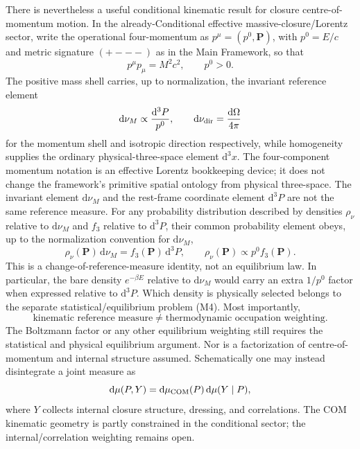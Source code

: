 \documentclass[11pt]{article}
\theoremstyle{definition}
\newcommand{\dd}{\mathrm{d}}
\begin{document}
There is nevertheless a useful conditional kinematic result for closure centre-of-momentum
motion.  In the already-Conditional effective massive-closure/Lorentz sector, write the
operational four-momentum as $p^\mu=(p^0,\bm P)$, with $p^0=E/c$
and metric signature $(+---)$ as in the Main Framework, so that
\begin{equation}
  p^\mu p_\mu=M^2c^2,\qquad p^0>0.
  \label{eq:mass-shell-reference}
\end{equation}
The positive mass shell carries, up to normalization, the invariant reference element
\begin{equation}
  \dd\nu_M\propto\frac{\dd^3P}{p^0},
  \qquad
  \dd\nu_{\rm dir}=\frac{\dd\Omega}{4\pi}
  \label{eq:com-reference-measures}
\end{equation}
for the momentum shell and isotropic direction respectively, while homogeneity supplies the
ordinary physical-three-space element $\dd^3x$.  The four-component momentum notation is an
effective Lorentz bookkeeping device; it does not change the framework's primitive spatial
ontology from physical three-space.  The invariant element $\dd\nu_M$ and the
rest-frame coordinate element $\dd^3P$ are not the same reference measure.  For any
probability distribution described by densities $\rho_\nu$ relative to $\dd\nu_M$
and $f_3$ relative to $\dd^3P$, their common probability element obeys, up to the
normalization convention for $\dd\nu_M$,
\begin{equation}
  \rho_\nu(\bm P)\,\dd\nu_M
  = f_3(\bm P)\,\dd^3P,
  \qquad \rho_\nu(\bm P)\propto p^0 f_3(\bm P).
  \label{eq:com-density-conversion}
\end{equation}
This is a change-of-reference-measure identity, not an equilibrium law.  In particular,
the bare density $e^{-\beta E}$ relative to $\dd\nu_M$ would carry an extra
$1/p^0$ factor when expressed relative to $\dd^3P$.  Which density is physically
selected belongs to the separate statistical/equilibrium problem (M4).
Most importantly,
\begin{equation}
  \boxed{
  \text{kinematic reference measure}
  \neq
  \text{thermodynamic occupation weighting}.}
  \label{eq:reference-not-thermal-weight}
\end{equation}
The Boltzmann factor or any other equilibrium weighting still requires the statistical and
physical equilibrium argument.  Nor is a factorization of centre-of-momentum and internal
structure assumed.  Schematically one may instead disintegrate a joint measure as
\begin{equation}
  \dd\mu(P,Y)=\dd\mu_{\rm COM}(P)\,\dd\mu(Y\mid P),
  \label{eq:measure-disintegration}
\end{equation}
where $Y$ collects internal closure structure, dressing, and correlations.  The COM kinematic
geometry is partly constrained in the conditional sector; the internal/correlation weighting
remains open.
\end{document}
